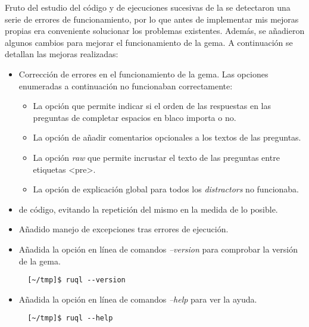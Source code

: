 

Fruto del estudio del c\'odigo y de ejecuciones sucesivas de la  se detectaron una serie de errores de funcionamiento,
por lo que antes de implementar mis mejoras propias era conveniente solucionar los problemas existentes.
Adem\'as, se a\~{n}adieron algunos cambios para mejorar el funcionamiento de la gema. A continuaci\'on se detallan las mejoras
realizadas:

\begin{itemize}
  \item Correcci\'on de errores en el funcionamiento de la gema. Las opciones enumeradas a continuaci\'on no funcionaban correctamente:
  \begin{itemize}
    \item La opci\'on que permite indicar si el orden de las respuestas en las preguntas de completar espacios en blaco importa o no.
    \item La opci\'on de a\~{n}adir comentarios opcionales a los textos de las preguntas.
    \item La opci\'on \textit{raw} que permite incrustar el texto de las preguntas entre etiquetas \textless pre\textgreater \space {}.
    \item La opci\'on de explicaci\'on global para todos los \textit{distractors} no funcionaba.
  \end{itemize}
  \item {} de c\'odigo, evitando la repetici\'on del mismo en la medida de lo posible.
  \item A\~{n}adido manejo de excepciones tras errores de ejecuci\'on.
  \item A\~{n}adida la opci\'on en l\'inea de comandos \textit{--version} para comprobar la versi\'on de la gema. 
  \begin{verbatim}
  [~/tmp]$ ruql --version
  \end{verbatim}
  \newpage
  
  \item A\~{n}adida la opci\'on en l\'inea de comandos \textit{--help} para ver la ayuda. 
  \begin{verbatim}
  [~/tmp]$ ruql --help
  \end{verbatim}
\end{itemize}
\bigskip

